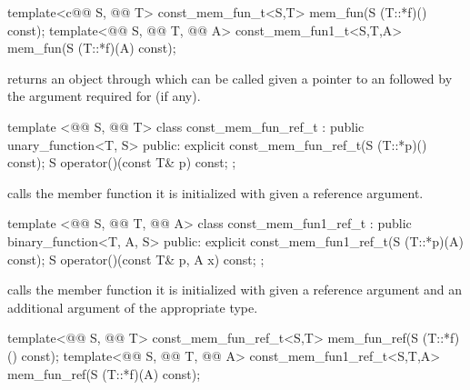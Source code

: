 \documentclass[american,twoside]{book}
\begin{document}
%
\begin{itemdecl}
template<c@@ S, @@ T> const_mem_fun_t<S,T>
   mem_fun(S (T::*f)() const);
template<@@ S, @@ T, @@ A> const_mem_fun1_t<S,T,A>
   mem_fun(S (T::*f)(A) const);
\end{itemdecl}

\begin{itemdescr}
\pnum
{} returns an object through which  can be
called given a pointer to an  followed by the argument required for
 (if any).
\end{itemdescr}

%
\begin{itemdecl}
template <@@ S, @@ T> class const_mem_fun_ref_t
      : public unary_function<T, S> {
public:
  explicit const_mem_fun_ref_t(S (T::*p)() const);
  S operator()(const T& p) const;
};
\end{itemdecl}

\begin{itemdescr}
\pnum
{} calls the member function it is initialized with
given a reference argument.
\end{itemdescr}

%
\begin{itemdecl}
template <@@ S, @@ T, @@ A> class const_mem_fun1_ref_t
      : public binary_function<T, A, S> {
public:
  explicit const_mem_fun1_ref_t(S (T::*p)(A) const);
  S operator()(const T& p, A x) const;
};
\end{itemdecl}

\begin{itemdescr}
\pnum
{} calls the member function it is initialized
with given a reference argument and an additional argument of the appropriate
type.
\end{itemdescr}

%
\begin{itemdecl}
template<@@ S, @@ T> const_mem_fun_ref_t<S,T>
   mem_fun_ref(S (T::*f)() const);
template<@@ S, @@ T, @@ A> const_mem_fun1_ref_t<S,T,A>
    mem_fun_ref(S (T::*f)(A) const);
\end{itemdecl}
\end{document}
